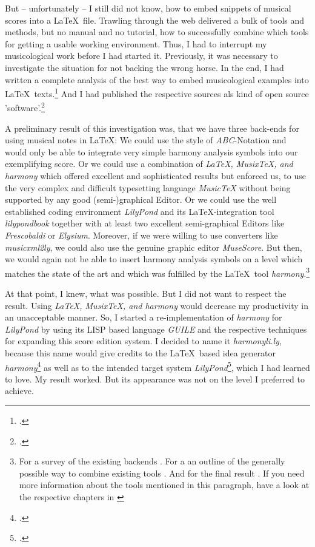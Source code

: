 \documentclass[
  DIV=calc,
  BCOR=5mm,
  12pt,
  headings=small,
  oneside,
  abstract=true,
  toc=bib,
  xcolor=dvipsnames,
  openany,
  ngerman,english]{scrartcl}
\newcommand{\acc}[0]{\textit}
\begin{document}
But -- unfortunately -- I still did not know, how to embed snippets of musical
scores into a \LaTeX\ file. Trawling through the web delivered a bulk of tools
and methods, but no manual and no tutorial, how to successfully combine which
tools for getting a usable working environment. Thus, I had to interrupt my
musicological work before I had started it. Previously, it was necessary to
investigate the situation for not backing the wrong horse. In the end, I had
written a complete analysis of the best way to embed musicological examples
into \LaTeX\ texts.\footcite[cf.][\nopage]{reincke2019c} And I had published the
respective sources als kind of open source
'software'.\footcite[cf.][\nopage]{reincke2019a}

A preliminary result of this investigation was, that we have three back-ends for
using musical notes in \LaTeX: We could use the style of \acc{ABC}-Notation and
would only be able to integrate very simple harmony analysis symbols into our
exemplifying score. Or we could use a combination of \acc{\LaTeX, Musix\TeX, and
harmony} which offered excellent and sophisticated results but enforced us, to
use the very complex and difficult typesetting language \acc{MusicTeX} without
being supported by any good (semi-)graphical Editor. Or we could use the well
established coding environment \acc{LilyPond} and its \LaTeX-integration tool
\acc{lilypondbook} together with at least two excellent semi-graphical Editors
like \acc{Frescobaldi} or \acc{Elysium}. Moreover, if we were willing to use
converters like \acc{music\-xml2ly}, we could also use the genuine graphic editor
\acc{MuseScore}. But then, we would again not be able to insert harmony
analysis symbols on a level which matches the state of the art and which was
fulfilled by the \LaTeX\ tool \acc{harmony}.\footnote{For a survey of the
existing backends \cite[cf.][19ff]{reincke2019c}. For a an outline of the
generally possible way to combine existing tools \cite[cf.][91f]{reincke2019c}.
And for the final result \cite[cf.][100f]{reincke2019c}. If you need more
information about the tools mentioned in this paragraph, have a look at the
respective chapters in \cite[cf.][\nopage et passim]{reincke2019c}}

At that point, I knew, what was possible. But I did not want to respect the
result. Using \acc{\LaTeX, Musix\TeX, and harmony} would decrease my
productivity in an unacceptable manner. So, I started a re-implementation of
\acc{harmony} for \acc{LilyPond} by using its LISP based language \acc{GUILE}
and the respective techniques for expanding this score edition system. I decided
to name it \acc{harmonyli.ly}, because this name would give credits to the
\LaTeX\ based idea generator \acc{harmony}\footcite[cf.][\nopage]{WegWeg2007a}
as well as to the intended target system \acc{LilyPond}\footcite[cf.][\nopage
wp]{LilyPond2018a}, which I had learned to love. My result worked. But its
appearance was not on the level I preferred to achieve.
\end{document}
